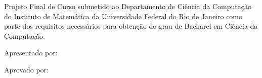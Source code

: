 \documentclass[brazil,pagestart=firstchapter]{abnt}
\begin{document}


\capa

\folhaderosto


\begin{folhadeaprovacao}

\setlength{\ABNTsignthickness}{0.4pt}
\setlength{\ABNTsignskip}{2cm}
\hspace*{1cm}

\centerline{\textbf{\large \ABNTtitulodata}}

\bigskip
\bigskip

\centerline{\textbf{\ABNTautordata}}

\bigskip
\bigskip

Projeto Final de Curso submetido ao Departamento de Ciência da Computação
do Instituto de Matemática da Universidade Federal do Rio de Janeiro como
parte dos requisitos necessários para obtenção do grau de Bacharel em
Ciência da Computação.

Apresentado por:

\assinatura{\ABNTautordata}

Aprovado por:


\bigskip
\bigskip
\bigskip

\begin{center}
\ABNTlocaldata

\ABNTdatadata
\end{center}

\end{folhadeaprovacao}





\end{document}
